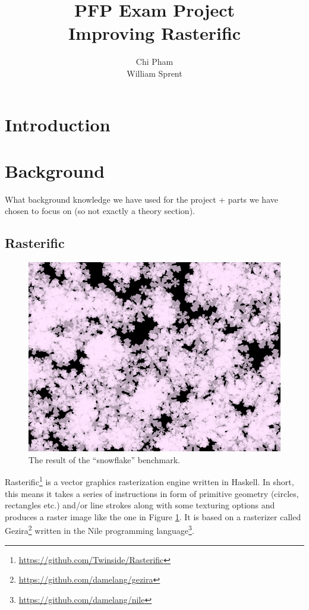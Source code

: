 \documentclass[12pt, a4paper]{article}
\begin{document}
\author{Chi Pham\\William Sprent}
\title{PFP Exam Project\\Improving Rasterific}
\maketitle

\tableofcontents
\clearpage

\section{Introduction}

\section{Background}\label{background}

What background knowledge we have used for the project + parts we have chosen to focus on (so not exactly a theory section).

\subsection{Rasterific}
\begin{figure}[h!]
  \centering
  \includegraphics[width=.4\linewidth]{../flakes}
  \caption{The result of the ``snowflake'' benchmark.}
  \label{fig:snowflakes}
\end{figure}

Rasterific\footnote{\url{https://github.com/Twinside/Rasterific}} is a vector graphics rasterization engine written in Haskell. In short, this means it takes a series
of instructions in form of primitive geometry (circles, rectangles etc.) and/or line strokes along with some texturing options and produces a raster image like the
 one in Figure \ref{fig:snowflakes}. It is based
 on a rasterizer called Gezira\footnote{\url{https://github.com/damelang/gezira}} written in the Nile programming language\footnote{\url{https://github.com/damelang/nile}}.
\end{document}
